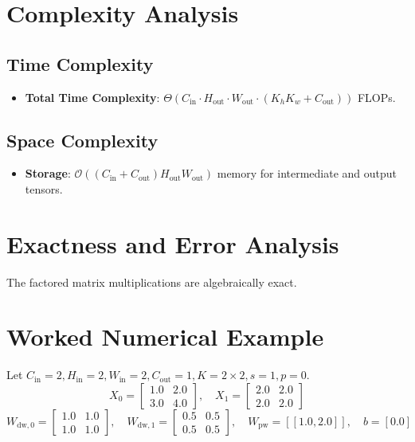 \documentclass[11pt,a4paper]{article}
\theoremstyle{definition}
\begin{document}
\section{Complexity Analysis}

\subsection{Time Complexity}
\begin{itemize}
    \item \textbf{Total Time Complexity}: $\Theta(C_{\text{in}} \cdot H_{\text{out}} \cdot W_{\text{out}} \cdot (K_h K_w + C_{\text{out}}))$ FLOPs.
\end{itemize}

\subsection{Space Complexity}
\begin{itemize}
    \item \textbf{Storage}: $\mathcal{O}((C_{\text{in}} + C_{\text{out}}) H_{\text{out}} W_{\text{out}})$ memory for intermediate and output tensors.
\end{itemize}

\section{Exactness and Error Analysis}

The factored matrix multiplications are algebraically exact.

\section{Worked Numerical Example}

Let $C_{\text{in}} = 2, H_{\text{in}} = 2, W_{\text{in}} = 2, C_{\text{out}} = 1, K = 2 \times 2, s = 1, p = 0$.
\begin{equation}
X_0 = \begin{bmatrix} 1.0 & 2.0 \\ 3.0 & 4.0 \end{bmatrix}, \quad X_1 = \begin{bmatrix} 2.0 & 2.0 \\ 2.0 & 2.0 \end{bmatrix}
\end{equation}
\begin{equation}
W_{\text{dw}, 0} = \begin{bmatrix} 1.0 & 1.0 \\ 1.0 & 1.0 \end{bmatrix}, \quad W_{\text{dw}, 1} = \begin{bmatrix} 0.5 & 0.5 \\ 0.5 & 0.5 \end{bmatrix}, \quad W_{\text{pw}} = [[1.0, 2.0]], \quad b = [0.0]
\end{equation}
\end{document}
